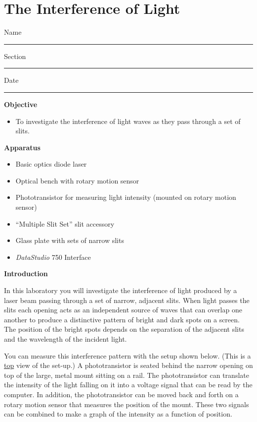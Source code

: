 
\section{The Interference of Light}

Name \rule{2.0in}{0.1pt}\hfill{}Section \rule{1.0in}{0.1pt}\hfill{}Date
\rule{1.0in}{0.1pt}

\textbf{Objective}

\begin{itemize}
\item To investigate the interference of light waves as they pass through
a set of slits. 
\end{itemize}
\textbf{Apparatus}

\begin{itemize}
\item Basic optics diode laser
\item Optical bench with rotary motion sensor
\item Phototransistor for measuring light intensity (mounted on rotary motion sensor)
\item ``Multiple Slit Set'' slit accessory
\item Glass plate with sets of narrow slits
\item {\it DataStudio} 750 Interface
\end{itemize}
\textbf{Introduction}

In this laboratory you will investigate the interference of light
produced by a laser beam passing through a set of narrow, adjacent
slits. When light passes the slits each opening acts as an independent
source of waves that can overlap one another to produce a distinctive
pattern of bright and dark spots on a screen. The position of the
bright spots depends on the separation of the adjacent slits and the
wavelength of the incident light. 

You can measure this interference pattern with the setup shown below. 
(This is a \underline{top} view of the set-up.) 
A phototransistor is seated behind the narrow opening on top of the large,
metal mount sitting on a rail. The phototransistor can translate the intensity 
of the light falling on it into a voltage signal that can be read by the
computer. In addition, the phototransistor can be moved back and
forth on a rotary motion sensor that measures the position of the 
mount. These two signals can be combined to
make a graph of the intensity as a function of position.

